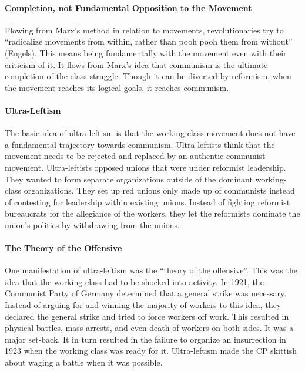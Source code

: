 \paragraph{Completion, not Fundamental Opposition to the Movement}

Flowing from Marx's method in relation to movements, revolutionaries try to ``radicalize movements from within, rather than pooh pooh them from without'' (Engels). This means being fundamentally with the movement even with their criticism of it. It flows from Marx's idea that communism is the ultimate completion of the class struggle. Though it can be diverted by reformism, when the movement reaches its logical goals, it reaches communism.

\paragraph{Ultra-Leftism}

The basic idea of ultra-leftism is that the working-class movement does not have a fundamental trajectory towards communism. Ultra-leftists think that the movement needs to be rejected and replaced by an authentic communist movement. Ultra-leftists opposed unions that were under reformist leadership. They wanted to form separate organizations outside of the dominant working-class organizations. They set up red unions only made up of communists instead of contesting for leadership within existing unions. Instead of fighting reformist bureaucrats for the allegiance of the workers, they let the reformists dominate the union's politics by withdrawing from the unions.

\paragraph{The Theory of the Offensive}

One manifestation of ultra-leftism was the ``theory of the offensive''. This was the idea that the working class had to be shocked into activity. In 1921, the Communist Party of Germany determined that a general strike was necessary. Instead of arguing for and winning the majority of workers to this idea, they declared the general strike and tried to force workers off work. This resulted in physical battles, mass arrests, and even death of workers on both sides. It was a major set-back. It in turn resulted in the failure to organize an insurrection in 1923 when the working class was ready for it. Ultra-leftism made the CP skittish about waging a battle when it was possible.

